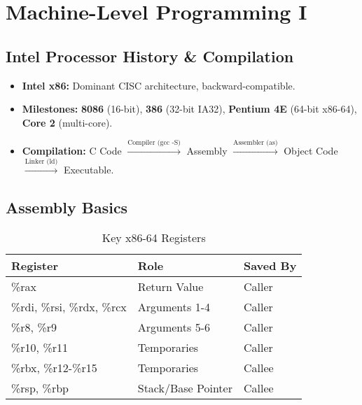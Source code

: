 \documentclass[10pt, twocolumn]{article}
\begin{document}
\section*{Machine-Level Programming I}

\subsection*{Intel Processor History \& Compilation}
\begin{itemize}
    \item \textbf{Intel x86:} Dominant CISC architecture, backward-compatible.
    \item \textbf{Milestones:} \textbf{8086} (16-bit), \textbf{386} (32-bit IA32), \textbf{Pentium 4E} (64-bit x86-64), \textbf{Core 2} (multi-core).
    \item \textbf{Compilation:} C Code $\xrightarrow{\text{Compiler (gcc -S)}}$ Assembly $\xrightarrow{\text{Assembler (as)}}$ Object Code $\xrightarrow{\text{Linker (ld)}}$ Executable.
\end{itemize}

\subsection*{Assembly Basics}
\begin{table}[h]
    \centering
    \caption{Key x86-64 Registers}
    \scriptsize
    \begin{tabular}{@{}lll@{}}
        \toprule
        Register & Role & Saved By \\
        \midrule
        \%rax & Return Value & Caller \\
        \%rdi, \%rsi, \%rdx, \%rcx & Arguments 1-4 & Caller \\
        \%r8, \%r9 & Arguments 5-6 & Caller \\
        \%r10, \%r11 & Temporaries & Caller \\
        \%rbx, \%r12-\%r15 & Temporaries & Callee \\
        \%rsp, \%rbp & Stack/Base Pointer & Callee \\
        \bottomrule
    \end{tabular}
\end{table}
\end{document}

